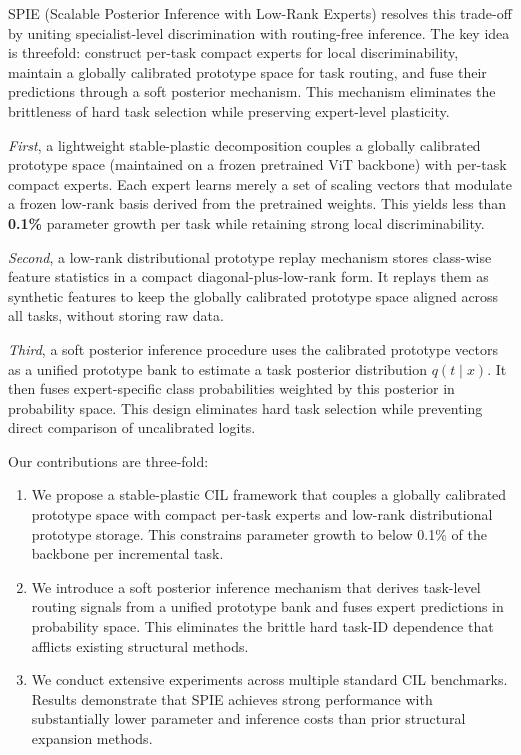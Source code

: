 SPIE (Scalable Posterior Inference with Low-Rank Experts) resolves this trade-off by uniting specialist-level discrimination with routing-free inference. The key idea is threefold: construct per-task compact experts for local discriminability, maintain a globally calibrated prototype space for task routing, and fuse their predictions through a soft posterior mechanism. This mechanism eliminates the brittleness of hard task selection while preserving expert-level plasticity.

\textit{First}, a lightweight stable-plastic decomposition couples a globally calibrated prototype space (maintained on a frozen pretrained ViT backbone) with per-task compact experts. Each expert learns merely a set of scaling vectors that modulate a frozen low-rank basis derived from the pretrained weights. This yields less than \textbf{0.1\%} parameter growth per task while retaining strong local discriminability.

\textit{Second}, a low-rank distributional prototype replay mechanism stores class-wise feature statistics in a compact diagonal-plus-low-rank form. It replays them as synthetic features to keep the globally calibrated prototype space aligned across all tasks, without storing raw data.

\textit{Third}, a soft posterior inference procedure uses the calibrated prototype vectors as a unified prototype bank to estimate a task posterior distribution $q(t \mid x)$. It then fuses expert-specific class probabilities weighted by this posterior in probability space. This design eliminates hard task selection while preventing direct comparison of uncalibrated logits.

Our contributions are three-fold:
\begin{enumerate}[leftmargin=*,nosep]
    \item We propose a stable-plastic CIL framework that couples a globally calibrated prototype space with compact per-task experts and low-rank distributional prototype storage. This constrains parameter growth to below 0.1\% of the backbone per incremental task.
    \item We introduce a soft posterior inference mechanism that derives task-level routing signals from a unified prototype bank and fuses expert predictions in probability space. This eliminates the brittle hard task-ID dependence that afflicts existing structural methods.
    \item We conduct extensive experiments across multiple standard CIL benchmarks. Results demonstrate that SPIE achieves strong performance with substantially lower parameter and inference costs than prior structural expansion methods.
\end{enumerate}
